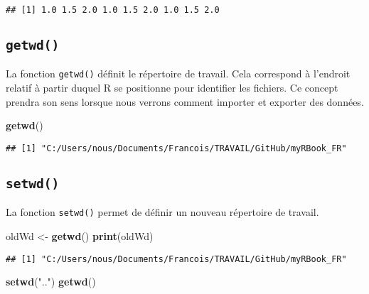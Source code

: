 \documentclass[]{book}
\newenvironment{Shaded}{\begin{snugshade}}{\end{snugshade}}
\newcommand{\KeywordTok}[1]{\textcolor[rgb]{0.13,0.29,0.53}{\textbf{#1}}}
\newcommand{\StringTok}[1]{\textcolor[rgb]{0.31,0.60,0.02}{#1}}
\newcommand{\NormalTok}[1]{#1}
\theoremstyle{definition}
\theoremstyle{definition}
\theoremstyle{definition}
\theoremstyle{remark}
\begin{document}
\begin{verbatim}
## [1] 1.0 1.5 2.0 1.0 1.5 2.0 1.0 1.5 2.0
\end{verbatim}

\hypertarget{l015getwd}{\subsection{\texorpdfstring{\texttt{getwd()}}{getwd()}}\label{l015getwd}}

La fonction \texttt{getwd()} définit le répertoire de travail. Cela
correspond à l'endroit relatif à partir duquel R se positionne pour
identifier les fichiers. Ce concept prendra son sens lorsque nous
verrons comment importer et exporter des données.

\begin{Shaded}
\begin{Highlighting}[]
\KeywordTok{getwd}\NormalTok{()}
\end{Highlighting}
\end{Shaded}

\begin{verbatim}
## [1] "C:/Users/nous/Documents/Francois/TRAVAIL/GitHub/myRBook_FR"
\end{verbatim}

\hypertarget{l015setwd}{\subsection{\texorpdfstring{\texttt{setwd()}}{setwd()}}\label{l015setwd}}

La fonction \texttt{setwd()} permet de définir un nouveau répertoire de
travail.

\begin{Shaded}
\begin{Highlighting}[]
\NormalTok{oldWd <-}\StringTok{ }\KeywordTok{getwd}\NormalTok{()}
\KeywordTok{print}\NormalTok{(oldWd)}
\end{Highlighting}
\end{Shaded}

\begin{verbatim}
## [1] "C:/Users/nous/Documents/Francois/TRAVAIL/GitHub/myRBook_FR"
\end{verbatim}

\begin{Shaded}
\begin{Highlighting}[]
\KeywordTok{setwd}\NormalTok{(}\StringTok{".."}\NormalTok{)}
\KeywordTok{getwd}\NormalTok{()}
\end{Highlighting}
\end{Shaded}
\end{document}
